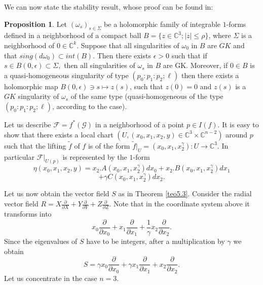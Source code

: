 \documentclass{amsart}
\theoremstyle{definition}
\theoremstyle{proposition}
\newtheorem{proposition}[theorem]{Proposition}
\numberwithin{equation}{section}
\theoremstyle{main}
\begin{document}
 
 We can now state the stability result, whose proof can be found in\break \cite{ccgl}:
 \begin{proposition}\label{prop5.5} Let $(\omega_{s})_{s \in \Sigma}$ be a holomorphic family of integrable $1$-forms defined in a neighborhood of a compact ball  $B= \{ {z \in {\mathbb{C}^3} ; |z|} \leq \rho \}$, where $\Sigma$ is a neighborhood of $0 \in {\mathbb{C}^k}.$  Suppose that all singularities of $\omega_{0}$ in $B$ are $GK$ and that $sing(d\omega_{0})\subset int(B)$. Then there exists $\epsilon >0$ such that if $s \in B(0,\epsilon)\subset\Sigma,$ then all singularities of $\omega_{s}$ in $B$ are GK. Moreover, if $0 \in B$ is a quasi-homogeneous singularity of type $(p_{0}:p_{1}:p_{2};\ell)$ then there exists a holomorphic map $B(0,\epsilon) \ni s \mapsto z(s)$, such that $z(0)=0$ and $z(s)$ is a $GK$ singularity of  $\omega_{s}$ of the same type (quasi-homogeneous of the type $(p_{0}:p_{1}:p_{2};\ell)$, according to the case).
 \end{proposition}
 
 Let us describe  $\mathcal{F} = f^*(\mathcal{G})$ in a neighborhood of a point $p \in I(f).$
\noindent It is easy to show that there exists a local chart $(U,(x_0,x_1,x_2,y)\in \mathbb C^3\times \mathbb C^{n-2})$  around $p$ such that the lifting $\tilde f$ of $f$ is of the form $\tilde f|_{U}=(x_{0},x_{1},x^{\gamma} _{2}):U \to {\mathbb{C}^3}$. In particular $\mathcal {F}|_{U(p)}$ is represented by the $1$-form 
\begin{equation}\label{eta}
\eta (x_{0},x_{1},x_{2},y) = x_{2}.A(x_{0},x_{1},x^{\gamma} _{2})dx_{0} 
+ x_{2}.B(x_{0},x_{1},x^{\gamma} _{2})dx_{1}\end{equation}\begin{equation*} + \gamma C(x_{0},x_{1},x^{\gamma} _{2})dx_{2}. 
\end{equation*}

Let us now obtain the vector field $S$ as in Theorem \ref{teo5.3}. Consider the radial vector field $R=X \frac{\partial}{\partial X}+ Y \frac{\partial}{\partial Y}+ Z \frac{\partial}{\partial Z}$. Note that in the coordinate system above it transforms into
$$ x_{0}  \frac{\partial}{\partial x_{0}}+x_{1}  \frac{\partial}{\partial x_{1}}+\frac{1}{\gamma}x_{2}  \frac{\partial}{\partial x_{2}}.$$ Since the eigenvalues of $S$ have to be integers, after a multiplication by ${\gamma}$ we obtain $$S={\gamma} x_{0} \frac{\partial}{\partial x_{0}}+ {\gamma}x_{1} \frac{\partial}{\partial x_{1}}+x_{2} \frac{\partial}{\partial x_{2}}.$$
 Let us concentrate in the case $n=3$.
\end{document}
